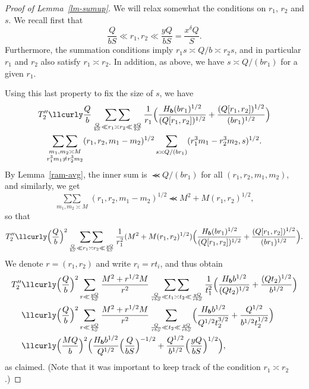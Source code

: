 \documentclass[12pt,a4paper,reqno]{amsart}
\numberwithin{equation}{section}
\theoremstyle{plain}
\theoremstyle{definition}
\newcommand{\uple}[1]{\text{\boldmath${#1}$}}
\newcommand\sumsum{\mathop{\sum\sum}\limits}
\renewcommand{\sim}{\asymp}
\renewcommand{\lessapprox}{\llcurly}
\begin{document}
\begin{proof}[Proof of Lemma~\ref{lm-sumup}]
  We will relax somewhat the conditions on $r_1$, $r_2$ and $s$. We
  recall first that
$$
\frac{Q}{bS}\ll r_1,r_2\ll \frac{yQ}{bS}=\frac{x^{\delta}Q}{S}.
$$
Furthermore, the summation conditions imply $r_1s\sim Q/b\sim r_2s$,
and in particular $r_1$ and $r_2$ also satisfy $r_1\sim r_2$. In
addition, as above, we have $s\sim Q/(br_1)$ for a given $r_1$.
\par
Using this last property to fix the size of $s$, we have
\begin{multline*}
  T''_2\lessapprox \frac{Q}{b}\sumsum_{\frac{Q}{bS}\ll r_1\sim r_2\ll
    \frac{yQ}{bS}}\frac{1}{r_1}
  \Bigl(\frac{H_{\uple{b}}(br_1)^{1/2}}{(Q[r_1,r_2])^{1/2}}+
  \frac{(Q[r_1,r_2])^{1/2}}{(br_1)^{1/2}}\Bigr)\\
  \sumsum_{\substack{m_1,m_2\sim M\\ r_1^3m_1\neq r_2^3m_2}}
  (r_1,r_2,m_1-m_2)^{1/2} \sum_{s\sim
    Q/(br_1)}(r_1^3m_1-r_2^3m_2,s)^{1/2}.
\end{multline*}
By Lemma~\ref{ram-avg}, the inner sum is $\lessapprox Q/(br_1)$ for
all $(r_1,r_2,m_1,m_2)$, and similarly, we get
$$
\sumsum_{m_1,m_2\sim M} (r_1,r_2,m_1-m_2)^{1/2}
\lessapprox M^2+M(r_1,r_2)^{1/2},
$$
so that
$$
T''_2\lessapprox \Bigl(\frac{Q}{b}\Bigr)^2\sumsum_{\frac{Q}{bS}\ll
  r_1\sim r_2\ll \frac{yQ}{bS}}\frac{1}{r_1^2}(M^2+M(r_1,r_2)^{1/2})
\Bigl(\frac{H_{\uple{b}}(br_1)^{1/2}}{(Q[r_1,r_2])^{1/2}}+
\frac{(Q[r_1,r_2])^{1/2}}{(br_1)^{1/2}}\Bigr).
$$
We denote $r=(r_1,r_2)$ and write $r_i=rt_i$, and thus obtain
\begin{align*}
  T''_2&\lessapprox \Bigl(\frac{Q}{b}\Bigr)^2 \sum_{r\ll
    \frac{yQ}{bS}}\frac{M^2+r^{1/2}M}{r^2}\sumsum_{\frac{Q}{rbS}\ll
    t_1\sim t_2\ll \frac{yQ}{rbS}}\frac{1}{t_1^2}
  \Bigl(\frac{H_{\uple{b}}b^{1/2}}{(Qt_2)^{1/2}}+
  \frac{(Qt_2)^{1/2}}{b^{1/2}}\Bigr)\\
  &\lessapprox \Bigl(\frac{Q}{b}\Bigr)^2 \sum_{r\ll
    \frac{yQ}{bS}}\frac{M^2+r^{1/2}M}{r^2} \sum_{\frac{Q}{rbS}\ll
    t_2\ll \frac{yQ}{rbS}} \Bigl(
  \frac{H_{\uple{b}}b^{1/2}}{Q^{1/2}t_2^{3/2}} +
  \frac{Q^{1/2}}{b^{1/2}t_2^{1/2}}
  \Bigr)\\
  &\lessapprox \Bigl(\frac{MQ}{b}\Bigr)^2 \Bigl(
  \frac{H_{\uple{b}}b^{1/2}}{Q^{1/2}} \Bigl(\frac{Q}{bS}\Bigr)^{-1/2}+
  \frac{Q^{1/2}}{b^{1/2}}\Bigl(\frac{yQ}{bS}\Bigr)^{1/2} \Bigr),
\end{align*}
as claimed. (Note that it was important to keep track of the condition
$r_1\sim r_2$.)
\end{proof}
\end{document}
